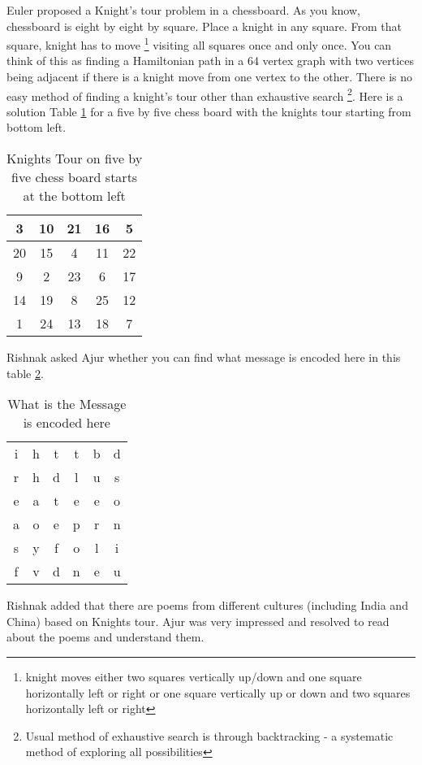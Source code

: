 Euler proposed a Knight's tour problem in a chessboard. As you know, chessboard is eight by eight by square. Place a knight in any square. From that square, knight has to move \footnote{knight moves either two squares vertically up/down and one square horizontally left or right or one square vertically up or down and two squares horizontally left or right} visiting all squares once and only once. You can think of this as finding a Hamiltonian path in a 64 vertex graph with two vertices being adjacent if there is a knight move from one vertex to the other. There is no easy method of finding a knight's tour other than exhaustive search \footnote{Usual method of exhaustive search is through backtracking - a systematic method of exploring all possibilities}. Here is a solution Table \ref{5t1} for a five by five chess board with the knights tour starting from bottom left.
\begin{table}
\centering
\begin{tabular}{|c |c |c| c| c|} 
 \hline
3&10&21&16& 5\\
\hline
20&15& 4&11&22\\
\hline
 9& 2&23& 6&17\\
 \hline
14&19& 8&25&12\\
\hline
 1&24&13&18& 7\\
 \hline
\end{tabular}
\caption{Knights Tour on five by five chess board starts at the bottom left}
\label{5t1}
\end{table}
Rishnak asked Ajur whether you can find what message is encoded here in this table \ref{5t2}.
\begin{table}
\centering
\begin{tabular}{c c c c cc}
i &h &t& t& b& d\\
r& h& d& l& u& s\\
e &a &t& e& e& o\\
a &o& e& p& r& n\\
s& y& f &o& l& i\\
f &v& d& n &e& u\\
\end{tabular}
\caption{What is the Message is encoded here}
\label{5t2}
\end{table}
Rishnak added that there are poems from different cultures (including India and China) based on Knights tour. Ajur was very impressed and resolved to read about the poems and understand them. 